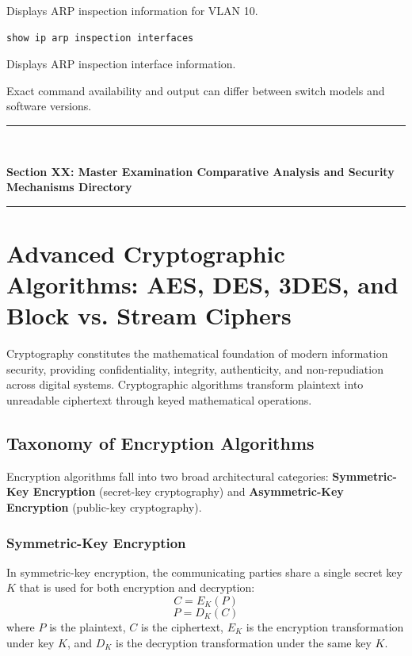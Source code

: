 Displays ARP inspection information for VLAN 10.

\begin{lstlisting}
show ip arp inspection interfaces
\end{lstlisting}

Displays ARP inspection interface information.

Exact command availability and output can differ between switch models and software versions.


\newpage
\begin{center}
\vspace{0.5em}
{\color{primary}\rule{0.45\textwidth}{1.2pt}\\[4pt]}
{\Large\bfseries\color{primary} Section XX: Master Examination Comparative Analysis and Security Mechanisms Directory\\[2pt]}
{\color{primary}\rule{0.45\textwidth}{1.2pt}}
\vspace{0.5em}
\end{center}


\section{Advanced Cryptographic Algorithms: AES, DES, 3DES, and Block vs. Stream Ciphers}

Cryptography constitutes the mathematical foundation of modern information security, providing confidentiality, integrity, authenticity, and non-repudiation across digital systems. Cryptographic algorithms transform plaintext into unreadable ciphertext through keyed mathematical operations.

\subsection{Taxonomy of Encryption Algorithms}

Encryption algorithms fall into two broad architectural categories: \textbf{Symmetric-Key Encryption} (secret-key cryptography) and \textbf{Asymmetric-Key Encryption} (public-key cryptography).

\subsubsection{Symmetric-Key Encryption}

In symmetric-key encryption, the communicating parties share a single secret key $K$ that is used for both encryption and decryption:
\[ C = E_K(P) \]
\[ P = D_K(C) \]
where $P$ is the plaintext, $C$ is the ciphertext, $E_K$ is the encryption transformation under key $K$, and $D_K$ is the decryption transformation under the same key $K$.

